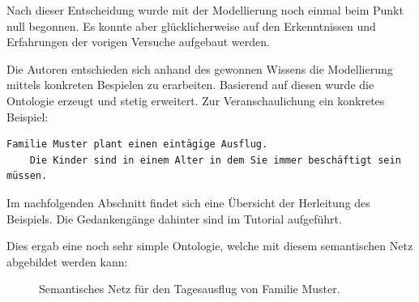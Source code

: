 Nach dieser Entscheidung wurde mit der Modellierung noch einmal beim Punkt null begonnen. Es konnte aber glücklicherweise auf den Erkenntnissen und Erfahrungen der vorigen Versuche aufgebaut werden.

Die Autoren entschieden sich anhand des gewonnen Wissens die Modellierung mittels konkreten Bespielen zu erarbeiten. Basierend auf diesen wurde die Ontologie erzeugt und stetig erweitert. Zur Veranschaulichung ein konkretes Beispiel:

\begin{lstlisting}[caption={Konkretes Beispiel einer Reiseplanung.},captionpos=b]
    Familie Muster plant einen eintägige Ausflug.
    Die Kinder sind in einem Alter in dem Sie immer beschäftigt sein müssen.
\end{lstlisting}

Im nachfolgenden Abschnitt findet sich eine Übersicht der Herleitung des Beispiels. Die Gedankengänge dahinter sind im Tutorial aufgeführt.

\newpage

Dies ergab eine noch sehr simple Ontologie, welche mit diesem semantischen Netz abgebildet werden kann:

\begin{figure}[H]
\centering {}
\caption{Semantisches Netz für den Tagesausflug von Familie Muster.\label{fig:famMuster}\protect\footnotemark}
\end{figure}

